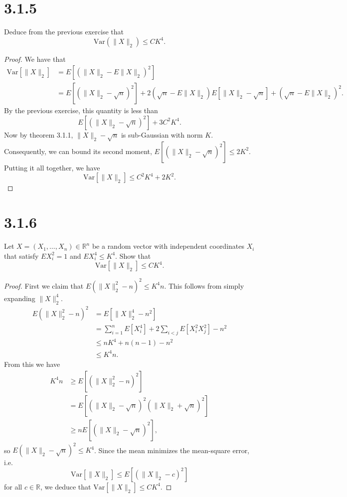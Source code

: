 \documentclass[11pt,letterpaper]{report}
\newcommand{\reals}{\mathbb{R}}
\newcommand{\Var}{\text{Var}}
\begin{document}
\section*{3.1.5}
Deduce from the previous exercise that
\[
\Var(\|X\|_2) \leq CK^4.
\]
\begin{proof}
	We have that
	\begin{align*}
		\Var[\|X\|_2] &= E\left[(\|X\|_2 - E\|X\|_2)^2\right]\\
		&= E\left[(\|X\|_2 - \sqrt{n})^2\right] + 2(\sqrt{n}-E\|X\|_2)E[\|X\|_2-\sqrt{n}] + (\sqrt{n}-E\|X\|_2)^2.
	\end{align*}
	By the previous exercise, this quantity is less than
	\[
	E\left[(\|X\|_2-\sqrt{n})^2\right]+3C^2K^4.
	\]
	Now by theorem 3.1.1, $\|X\|_2-\sqrt{n}$ is sub-Gaussian with norm $K$. Consequently, we can bound its second moment, $E[(\|X\|_2-\sqrt{n})^2] \leq 2K^2$. Putting it all together, we have
	\[
	\Var[\|X\|_2] \leq C^2K^4+ 2K^2.
	\]
\end{proof}










\section*{3.1.6}
Let $X = (X_1, \ldots, X_n)\in \reals^n$ be a random vector with independent coordinates $X_i$ that satisfy $EX_i^2 = 1$ and $EX_i^4 \leq K^4$. Show that
\[
\Var[\|X\|_2] \leq CK^4.
\]
\begin{proof}
	First we claim that $E(\|X\|_2^2-n)^2 \leq K^4n$. This follows from simply expanding $\|X\|_2^4$.
	\begin{align*}
		E(\|X\|_2^2-n)^2 &= E\left[\|X\|_2^4 - n^2\right]\\
		&= \sum_{i=1}^nE[X_i^4] + 2\sum_{i<j}E[X_i^2X_j^2] - n^2\\
		&\leq nK^4 + n(n-1)-n^2\\
		&\leq K^4n.
	\end{align*}
	From this we have
	\begin{align*}
		K^4n &\geq E\left[\left(\|X\|_2^2-n\right)^2\right]\\
		&= E\left[\left(\|X\|_2-\sqrt{n}\right)^2\left(\|X\|_2+\sqrt{n}\right)^2\right]\\
		&\geq nE\left[\left(\|X\|_2-\sqrt{n}\right)^2\right],
	\end{align*}
	so $E(\|X\|_2-\sqrt{n})^2 \leq K^4$. Since the mean minimizes the mean-square error, i.e.
	\[
	\Var[\|X\|_2] \leq E[(\|X\|_2 - c)^2]
	\]
	for all $c\in \reals$, we deduce that $\Var[\|X\|_2] \leq CK^4$.
\end{proof}
\end{document}
